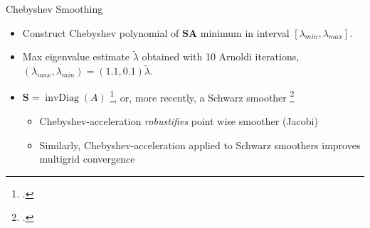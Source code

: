 \begin{frame}{Chebyshev Smoothing}
\begin{itemize}
  \item Construct Chebyshev polynomial of $\mathbf {SA}$ minimum in interval $[\lambda_{min}, \lambda_{max}]$.
  \item Max eigenvalue estimate $\tilde{\lambda}$ obtained with 10 Arnoldi iterations,
        $(\lambda_{max}, \lambda_{min}) = (1.1,0.1)\tilde{\lambda}$.
  \item $\mathbf S = \operatorname{invDiag}(A)$ \footcite{adams_parallel_2003, Kronbichler2019}, or, more recently, a Schwarz smoother \footcite{phillips-tuning-2022}
  \begin{itemize}
    \item Chebyshev-acceleration \emph{robustifies} point wise smoother (Jacobi)
    \item Similarly, Chebyshev-acceleration applied to Schwarz smoothers improves multigrid convergence
  \end{itemize}
\end{itemize}
\end{frame}